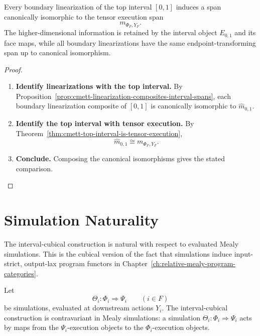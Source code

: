 \begin{corollary}
\label{cor:cmett-top-cell-interleaving-invariance}
    Every boundary linearization of the top interval \([0,1]\) induces a span
    canonically isomorphic to the tensor execution span
    \[
        m_{\Phi_F,Y_F}.
    \]
    The higher-dimensional information is retained by the interval object
    \(E_{0,1}\) and its face maps, while all boundary linearizations have the
    same endpoint-transforming span up to canonical isomorphism.
\end{corollary}

\begin{proof}
    \leavevmode
    \begin{enumerate}
        \item \textbf{Identify linearizations with the top interval.}
        By Proposition~\ref{prop:cmett-linearization-composites-interval-spans},
        each boundary linearization composite of \([0,1]\) is canonically
        isomorphic to \(\widehat m_{0,1}\).

        \item \textbf{Identify the top interval with tensor execution.}
        By Theorem~\ref{thm:cmett-top-interval-is-tensor-execution},
        \[
            \widehat m_{0,1}\cong m_{\Phi_F,Y_F}.
        \]

        \item \textbf{Conclude.}
        Composing the canonical isomorphisms gives the stated comparison.
    \end{enumerate}
\end{proof}

\section{Simulation Naturality}
\label{sec:cmett-simulation-naturality}

The interval-cubical construction is natural with respect to evaluated Mealy
simulations. This is the cubical version of the fact that simulations induce
input-strict, output-lax program functors in
Chapter~\ref{ch:relative-mealy-program-categories}.

Let
\[
    \Theta_i:\Phi_i\Rightarrow\Psi_i
    \qquad (i\in F)
\]
be simulations, evaluated at downstream actions \(Y_i\). The interval-cubical
construction is contravariant in Mealy simulations: a simulation
\(\Theta_i:\Phi_i\Rightarrow\Psi_i\) acts by maps from the
\(\Psi_i\)-execution objects to the \(\Phi_i\)-execution objects.

